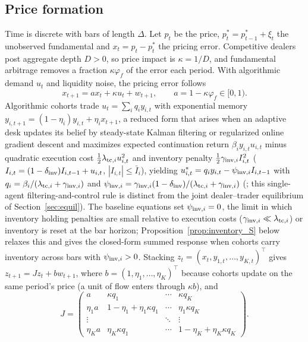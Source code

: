 \documentclass[12pt]{article}
\theoremstyle{definition}
\theoremstyle{remark}
\begin{document}
\subsection{Price formation}
Time is discrete with bars of length $\Delta$. Let $p_t$ be the price, $p^*_t=p^*_{t-1}+\xi_t$ the unobserved fundamental and $x_t=p_t-p^*_t$ the pricing error. Competitive dealers post aggregate depth $D>0$, so price impact is $\kappa=1/D$, and fundamental arbitrage removes a fraction $\kappa\varphi_f$ of the error each period. With algorithmic demand $u_t$ and liquidity noise, the pricing error follows
\begin{equation}\label{eq:price}
x_{t+1}=ax_t+\kappa u_t+w_{t+1},\qquad a=1-\kappa\varphi_f\in[0,1).
\end{equation}
Algorithmic cohorts trade $u_t=\sum_iq_iy_{i,t}$ with exponential memory $y_{i,t+1}=(1-\eta_i)y_{i,t}+\eta_ix_{t+1}$, a reduced form that arises when an adaptive desk updates its belief by steady-state Kalman filtering or regularized online gradient descent and maximizes expected continuation return $\beta_i y_{i,t}u_{i,t}$ minus quadratic execution cost $\tfrac12\lambda_{{\rm tc},i}u_{i,t}^2$ and inventory penalty $\tfrac12\gamma_{{\rm inv},i}I_{i,t}^2$ ($I_{i,t}=(1-\delta_{\rm inv})I_{i,t-1}+u_{i,t}$, $|I_{i,t}|\le\bar I_i$), yielding $u_{i,t}^*=q_iy_{i,t}-\psi_{{\rm inv},i}I_{i,t-1}$ with $q_i=\beta_i/(\lambda_{{\rm tc},i}+\gamma_{{\rm inv},i})$ and $\psi_{{\rm inv},i}=\gamma_{{\rm inv},i}(1-\delta_{\rm inv})/(\lambda_{{\rm tc},i}+\gamma_{{\rm inv},i})$ (\citealp{niroula2026}; this single-agent filtering-and-control rule is distinct from the joint dealer--trader equilibrium of Section~\ref{sec:equil}). The baseline equations set $\psi_{{\rm inv},i}=0$, the limit in which inventory holding penalties are small relative to execution costs ($\gamma_{{\rm inv},i}\ll\lambda_{{\rm tc},i}$) or inventory is reset at the bar horizon; Proposition~\ref{prop:inventory_S} below relaxes this and gives the closed-form summed response when cohorts carry inventory across bars with $\psi_{{\rm inv},i}>0$. Stacking $z_t=(x_t,y_{1,t},\ldots,y_{K,t})^\top$ gives $z_{t+1}=Jz_t+bw_{t+1}$, where $b=(1,\eta_1,\ldots,\eta_K)^\top$ because cohorts update on the same period's price (a unit of flow enters through $\kappa b$), and
\begin{equation}\label{eq:J}
J=\begin{pmatrix} a & \kappa q_1 & \cdots & \kappa q_K\\ \eta_1 a & 1-\eta_1+\eta_1\kappa q_1 & \cdots & \eta_1\kappa q_K\\ \vdots & & \ddots & \vdots\\ \eta_K a & \eta_K\kappa q_1 & \cdots & 1-\eta_K+\eta_K\kappa q_K\end{pmatrix}.
\end{equation}
\end{document}
